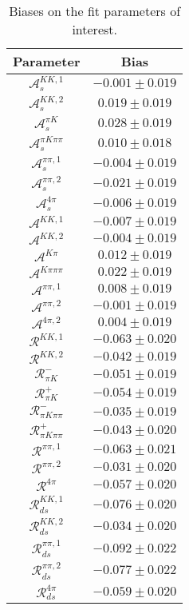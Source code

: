 \begin{table}
  \centering
  \small
  \begin{tabular}{cc}
  \toprule
      Parameter & Bias \\
  \midrule
      $\mathcal{A}_s^{KK,1}$ & $-0.001 \pm 0.019$ \\
      $\mathcal{A}_s^{KK,2}$ & $0.019 \pm 0.019$ \\
      $\mathcal{A}_s^{\pi K}$ & $0.028 \pm 0.019$ \\
      $\mathcal{A}_s^{\pi K\pi\pi}$ & $0.010 \pm 0.018$ \\
      $\mathcal{A}_s^{\pi\pi,1}$ & $-0.004 \pm 0.019$ \\
      $\mathcal{A}_s^{\pi\pi,2}$ & $-0.021 \pm 0.019$ \\
      $\mathcal{A}_s^{4\pi}$ & $-0.006 \pm 0.019$ \\
      $\mathcal{A}^{KK,1}$ & $-0.007 \pm 0.019$ \\
      $\mathcal{A}^{KK,2}$ & $-0.004 \pm 0.019$ \\
      $\mathcal{A}^{K\pi}$ & $0.012 \pm 0.019$ \\
      $\mathcal{A}^{K\pi\pi\pi}$ & $0.022 \pm 0.019$ \\
      $\mathcal{A}^{\pi\pi,1}$ & $0.008 \pm 0.019$ \\
      $\mathcal{A}^{\pi\pi,2}$ & $-0.001 \pm 0.019$ \\
      $\mathcal{A}^{4\pi,2}$ & $0.004 \pm 0.019$ \\
      $\mathcal{R}^{KK,1}$ & $-0.063 \pm 0.020$ \\
      $\mathcal{R}^{KK,2}$ & $-0.042 \pm 0.019$ \\
      $\mathcal{R}_{\pi K}^-$ & $-0.051 \pm 0.019$ \\
      $\mathcal{R}_{\pi K}^+$ & $-0.054 \pm 0.019$ \\
      $\mathcal{R}_{\pi K\pi\pi}^-$ & $-0.035 \pm 0.019$ \\
      $\mathcal{R}_{\pi K\pi\pi}^+$ & $-0.043 \pm 0.020$ \\
      $\mathcal{R}^{\pi\pi,1}$ & $-0.063 \pm 0.021$ \\
      $\mathcal{R}^{\pi\pi,2}$ & $-0.031 \pm 0.020$ \\
      $\mathcal{R}^{4\pi}$ & $-0.057 \pm 0.020$ \\
      $\mathcal{R}_{ds}^{KK,1}$ & $-0.076 \pm 0.020$ \\
      $\mathcal{R}_{ds}^{KK,2}$ & $-0.034 \pm 0.020$ \\
      $\mathcal{R}_{ds}^{\pi\pi,1}$ & $-0.092 \pm 0.022$ \\
      $\mathcal{R}_{ds}^{\pi\pi,2}$ & $-0.077 \pm 0.022$ \\
      $\mathcal{R}_{ds}^{4\pi}$ & $-0.059 \pm 0.020$ \\
      \bottomrule
  \end{tabular}
  \caption{Biases on the fit parameters of interest.}
\label{tab:biases}
\end{table}
